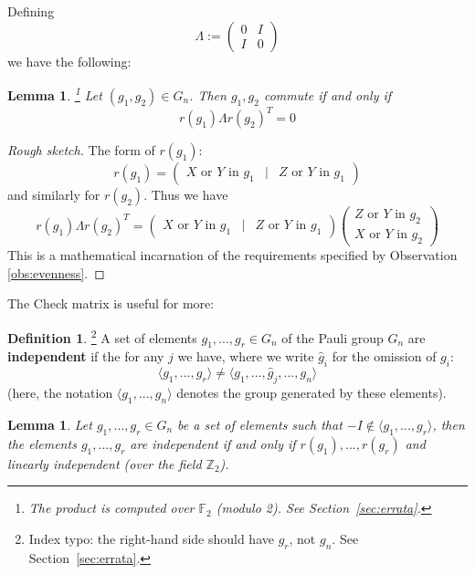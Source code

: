 \documentclass[12pt]{article}
\theoremstyle{plain}
\newtheorem{lemma}[thm]{Lemma}
\theoremstyle{definition}
\newtheorem{defn}[thm]{Definition} %
\newcommand{\bb}[1]{\mathbb{#1}}
\begin{document}
Defining
\begin{equation}
\Lambda :=
\begin{pmatrix}
0 & I\\
I & 0
\end{pmatrix}
\end{equation}
we have the following:
\begin{lemma}\footnote{The product is computed over $\mathbb{F}_2$ (modulo 2). See Section~\ref{sec:errata}.}
Let $(g_1,g_2) \in G_n$. Then $g_1,g_2$ commute if and only if
\begin{equation}
r(g_1) \Lambda r(g_2)^T = 0
\end{equation}
\end{lemma}
\begin{proof}[Rough sketch]
The form of $r(g_1)$:
\begin{equation}
r(g_1) =
\begin{pmatrix}
X \text{ or } Y \text{ in }g_1 & | & Z \text{ or } Y\text{ in }g_1
\end{pmatrix}
\end{equation}
and similarly for $r(g_2)$. Thus we have
\begin{equation}
r(g_1) \Lambda r(g_2)^T = \begin{pmatrix}
X \text{ or } Y \text{ in }g_1 & | & Z \text{ or } Y\text{ in }g_1
\end{pmatrix}
\begin{pmatrix}
Z \text{ or } Y \text{ in }g_2\\
X \text{ or } Y \text{ in }g_2
\end{pmatrix}
\end{equation}
This is a mathematical incarnation of the requirements specified by Observation \ref{obs:evenness}.
\end{proof}
The Check matrix is useful for more:
\begin{defn}\footnote{Index typo: the right-hand side should have $g_r$, not $g_n$. See Section~\ref{sec:errata}.}
A set of elements $g_1,...,g_r \in G_n$ of the Pauli group $G_n$ are \textbf{independent} if the for any $j$ we have, where we write $\hat{g}_i$ for the omission of $g_i$:
\begin{equation}
\langle g_1,...,g_r \rangle \neq \langle g_1,...,\hat{g}_j, ..., g_n\rangle
\end{equation}
(here, the notation $\langle g_1,...,g_n\rangle$ denotes the group generated by these elements).
\end{defn}
\begin{lemma}\label{lem:lin_indep}
Let $g_1,...,g_r \in G_n$ be a set of elements such that $-I \not\in \langle g_1,...,g_r\rangle$, then the elements $g_1,...,g_r$ are independent if and only if $r(g_1),...,r(g_r)$ and linearly independent (over the field $\bb{Z}_2$).
\end{lemma}
\end{document}
